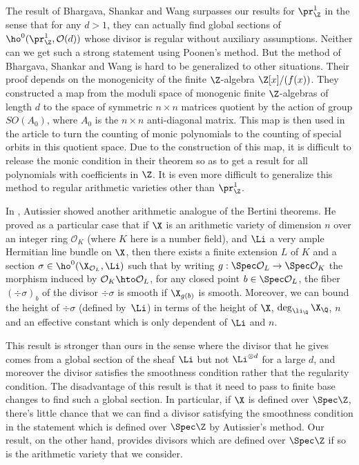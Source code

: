 The result of Bhargava, Shankar and Wang surpasses our results for $\pr^1_{\Z}$ in the sense that for any $d>1$, they can actually find global sections of $\ho^0(\pr^1_{\Z}, \mathcal{O}(d))$ whose divisor is regular without auxiliary assumptions. Neither can we get such a strong statement using Poonen's method. But the method of Bhargava, Shankar and Wang is hard to be generalized to other situations. Their proof depends on the monogenicity of the finite $\Z$-algebra $\Z[x]/(f(x))$. They constructed a map from the moduli space of monogenic finite $\Z$-algebras of length $d$ to the space of symmetric $n\times n$ matrices quotient by the action of group $SO(A_0)$, where $A_0$ is the $n\times n$ anti-diagonal matrix. This map is then used in the article to turn the counting of monic polynomials to the counting of special orbits in this quotient space. Due to the construction of this map, it is difficult to release the monic condition in their theorem so as to get a result for all polynomials with coefficients in $\Z$. It is even more difficult to generalize this method to regular arithmetic varieties other than $\pr^1_{\Z}$.\enlargethispage{\baselineskip}

In \cite{Au01}, Autissier showed another arithmetic analogue of the Bertini theorems. He proved as a particular case that if $\X$ is an arithmetic variety of dimension $n$ over an integer ring $\mathcal{O}_K$ (where $K$ here is a number field), and $\Li$ a very ample Hermitian line bundle on $\X$, then there exists a finite extension $L$ of $K$ and a section $\sigma\in \ho^0(\X_{\mathcal{O}_L}, \Li)$ such that by writing $g:\Spec \mathcal{O}_L\to \Spec \mathcal{O}_K$ the morphism induced by $\mathcal{O}_K\hto \mathcal{O}_L$, for any closed point $b\in \Spec \mathcal{O}_L$, the fiber $(\div \sigma)_b$ of the divisor $\div \sigma$ is smooth if $\X_{g(b)}$ is smooth. Moreover, we can bound the height of $\div \sigma$ (defined by~$\Li$) in terms of the height of $\X$, $\deg_{\li_{\Q}}\X_{\Q}$, $n$ and an effective constant which is only dependent of $\Li$ and $n$.

This result is stronger than ours in the sense where the divisor that he gives comes from a global section of the sheaf $\Li$ but not $\Li^{\otimes d}$ for a large $d$, and moreover the divisor satisfies the smoothness condition rather that the regularity condition. The disadvantage of this result is that it need to pass to finite base changes to find such a global section. In particular, if $\X$ is defined over $\Spec \Z$, there's little chance that we can find a divisor satisfying the smoothness condition in the statement which is defined over $\Spec \Z$ by Autissier's method. Our result, on the other hand, provides divisors which are defined over $\Spec \Z$ if so is the arithmetic variety that we consider.

